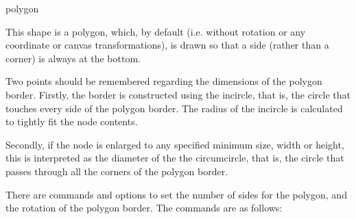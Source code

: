 %
%
%
%

\begin{shape}{polygon}

	This shape is a polygon, which, by default (i.e. without rotation
	or any coordinate or canvas transformations), is drawn so that a 
	side (rather than a corner) is always at the bottom. 

\begin{codeexample}[]
\end{codeexample}
	
	Two points should be remembered regarding the dimensions of the
	polygon border.
	Firstly,	the border is constructed using the incircle, that is, the
	circle that touches every side of the polygon border. The radius of
	the incircle is calculated to tightly fit the node contents.

\begin{codeexample}[]
\end{codeexample}	
	
	Secondly, if the node is enlarged to any specified minimum size, 
	width or height, this is interpreted as the diameter of the the 
	circumcircle, that is, the circle that	passes through all the 
	corners of the polygon border.

\begin{codeexample}[]
\end{codeexample}	

	There are \pgfname{} commands and \tikzname{} options to set the 
	number of sides for the polygon, and the rotation of the polygon 
	border. The \pgfname{} commands are as follows:
	

\end{shape}

